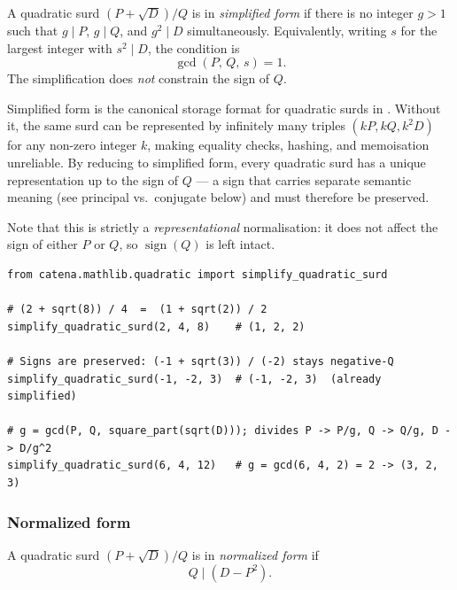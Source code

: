 \begin{definition}
  \label{def:simplified-surd}
  A quadratic surd $(P + \sqrt{D})/Q$ is in \emph{simplified form} if there is no integer $g > 1$
  such that $g \mid P$, $g \mid Q$, and $g^2 \mid D$ simultaneously.  Equivalently, writing $s$
  for the largest integer with $s^2 \mid D$, the condition is
  \[
    \gcd(P,\, Q,\, s) = 1.
  \]
  The simplification does \emph{not} constrain the sign of $Q$.
\end{definition}

\begin{remark}[Motivation]
  Simplified form is the canonical storage format for quadratic surds in \catena.
  Without it, the same surd can be represented by infinitely many triples $(kP, kQ, k^2 D)$ for
  any non-zero integer $k$, making equality checks, hashing, and memoisation unreliable.  By
  reducing to simplified form, every quadratic surd has a unique representation up to the sign of
  $Q$ — a sign that carries separate semantic meaning (see principal vs.\ conjugate below) and must
  therefore be preserved.

  Note that this is strictly a \emph{representational} normalisation: it does not affect the sign
  of either $P$ or $Q$, so $\operatorname{sign}(Q)$ is left intact.
\end{remark}

\begin{catenadef}
\begin{lstlisting}[style=python]
from catena.mathlib.quadratic import simplify_quadratic_surd

# (2 + sqrt(8)) / 4  =  (1 + sqrt(2)) / 2
simplify_quadratic_surd(2, 4, 8)    # (1, 2, 2)

# Signs are preserved: (-1 + sqrt(3)) / (-2) stays negative-Q
simplify_quadratic_surd(-1, -2, 3)  # (-1, -2, 3)  (already simplified)

# g = gcd(P, Q, square_part(sqrt(D))); divides P -> P/g, Q -> Q/g, D -> D/g^2
simplify_quadratic_surd(6, 4, 12)   # g = gcd(6, 4, 2) = 2 -> (3, 2, 3)
\end{lstlisting}
\end{catenadef}

\subsubsection{Normalized form}

\begin{definition}
  \label{def:normalized-surd}
  A quadratic surd $(P + \sqrt{D})/Q$ is in \emph{normalized form} if
  \[
    Q \mid (D - P^2).
  \]
\end{definition}


